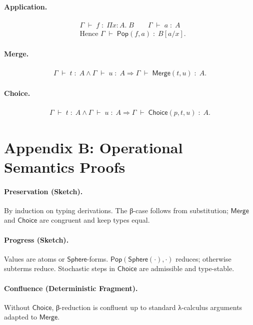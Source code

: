 \documentclass[12pt]{article}
\newcommand{\To}{\Rightarrow}
\newcommand{\Entails}{\;\vdash\;}
\newcommand{\Types}{\;:\;}
\newcommand{\Subst}[2]{[#1/#2]}
\newcommand{\Sphere}{\mathsf{Sphere}}
\newcommand{\Pop}{\mathsf{Pop}}
\newcommand{\Merge}{\mathsf{Merge}}
\newcommand{\Choice}{\mathsf{Choice}}
\newcommand{\Ctx}{\Gamma}
\newcommand{\PiT}[3]{\Pi #1 : #2.\; #3}
\newcommand{\Judgement}[3]{#1 \Entails #2 \Types #3}
\theoremstyle{definition}
\begin{document}
\paragraph{Application.}
\begin{align*}
&\Judgement{\Ctx}{f}{\PiT{x}{A}{B}} \qquad \Judgement{\Ctx}{a}{A}\\
&\text{Hence } \Judgement{\Ctx}{\Pop(f,a)}{B\Subst{a}{x}}.
\end{align*}

\paragraph{Merge.}
\begin{align*}
\Judgement{\Ctx}{t}{A}\wedge \Judgement{\Ctx}{u}{A} \To \Judgement{\Ctx}{\Merge(t,u)}{A}.
\end{align*}

\paragraph{Choice.}
\begin{align*}
\Judgement{\Ctx}{t}{A}\wedge \Judgement{\Ctx}{u}{A} \To \Judgement{\Ctx}{\Choice(p,t,u)}{A}.
\end{align*}

\section{Appendix B: Operational Semantics Proofs}
\paragraph{Preservation (Sketch).}
By induction on typing derivations. 
The β-case follows from substitution; $\Merge$ and $\Choice$ are congruent and keep types equal.

\paragraph{Progress (Sketch).}
Values are atoms or $\Sphere$-forms. 
$\Pop(\Sphere(\cdot),\cdot)$ reduces; otherwise subterms reduce. 
Stochastic steps in $\Choice$ are admissible and type-stable.

\paragraph{Confluence (Deterministic Fragment).}
Without $\Choice$, β-reduction is confluent up to standard λ-calculus arguments adapted to $\Merge$.
\end{document}
